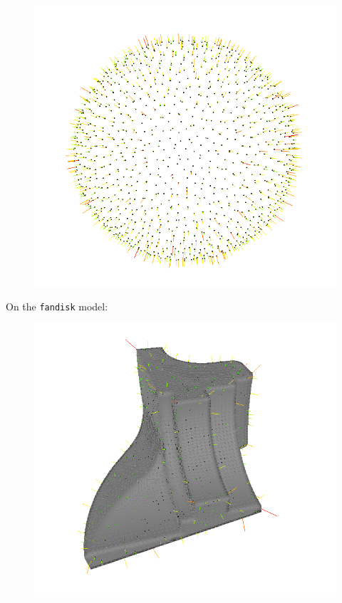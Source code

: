 \documentclass{beamer}
\begin{document}
\begin{frame}
\begin{figure}
        \includegraphics[scale=0.15]{img/sphere-sphere-1000-05}
    \end{figure}

    On the \texttt{fandisk} model:
    \begin{figure}
        \includegraphics[scale=0.18]{img/fandisk-normals}
    \end{figure}
\end{frame}
\end{document}
